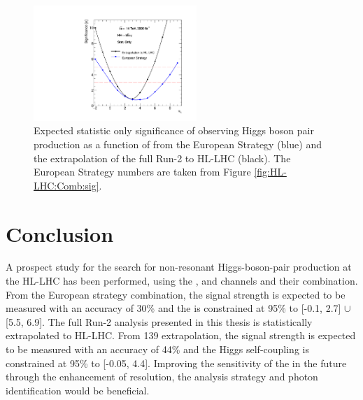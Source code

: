 \begin{figure}[htbp]
    \centering
    \includegraphics[width=0.55\textwidth]{Ch6/Img/sig.pdf}
    \begin{tcolorbox}[colback=black!5!white, colframe=white!75!black]
    \caption{Expected statistic only significance of observing Higgs boson pair production as a function of \kl from the European Strategy \bbyy (blue) and the extrapolation of the full Run-2 \bbyy to HL-LHC (black). The European Strategy numbers are taken from Figure \ref{fig:HL-LHC:Comb:sig}.}
    \label{fig:HL-LHC:Sig}
    \end{tcolorbox}
\end{figure}

\section{Conclusion}

A prospect study for the search for non-resonant Higgs-boson-pair production at the HL-LHC has been performed, using the \bbbb, \bbyy and \bbtt channels and their combination. From the European strategy combination, the signal strength is expected to be measured with an accuracy of 30\% and the \kl is constrained at 95\% to [-0.1, 2.7] $\cup$ [5.5, 6.9]. The full Run-2 \HHyybb analysis presented in this thesis is statistically extrapolated to HL-LHC. From 139 \ifb \HHyybb extrapolation, the signal strength is expected to be measured with an accuracy of 44\% and the Higgs self-coupling is constrained at 95\% to [-0.05, 4.4]. Improving the sensitivity of the \HHyybb in the future through the enhancement of \mbb resolution, the analysis strategy and photon identification would be beneficial.  
